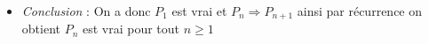 \documentclass[10pt,a4paper,twoside]{article}
\begin{document}
\begin{itemize}
\begin{align*}
\begin{array}{cc}
\end{array}\right) + (2p-1)^{n}  \left(\begin{array}{cc}
2p-1 & -(2p-1) \\
-(2p-1) & 2p-1 \\
\end{array}\right)\right)\\
=&\frac{1}{2}+(2p-1)^{n+1} \left(\begin{array}{cc}
1 & -1 \\
-1 & 1 \\
\end{array}\right)\\
G^{n+1} =& G_{1}+(2p-1)^{n+1}G_{2}\\
\end{align*}
Si $P_{n}$ est vérifiée alors $P_{n+1}$ l'est aussi. $P_{n}\Rightarrow P_{n+1}$.
\item \textit{Conclusion} : On a donc $P_{1}$ est vrai et $P_{n}\Rightarrow P_{n+1}$ ainsi par récurrence on obtient $P_{n}$ est vrai pour tout $n\geqslant 1$
\end{itemize}
\end{document}
